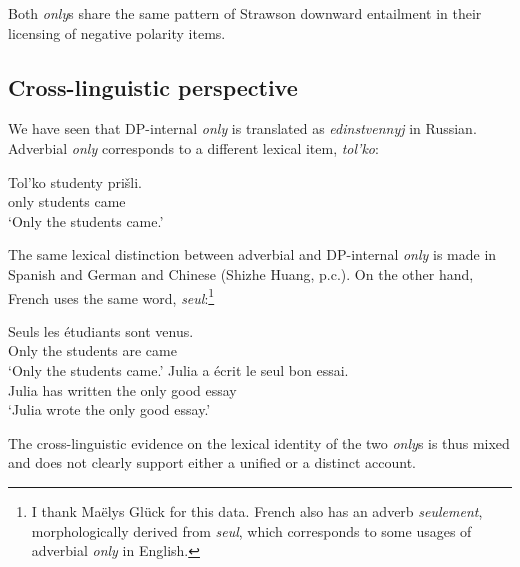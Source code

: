 Both \textit{only}s share the same pattern of Strawson downward entailment in their licensing of negative polarity items.

\subsection{Cross-linguistic perspective}
We have seen that DP-internal \textit{only} is translated as \textit{edinstvennyj} in Russian. Adverbial \textit{only} corresponds to a different lexical item, \textit{tol'ko}:

\begin{exe}
	\ex \gll Tol'ko studenty pri\v{s}li.\\
	only students came\\
	\glt `Only the students came.'
\end{exe}

The same lexical distinction between adverbial and DP-internal \textit{only} is made in Spanish and German \citep{mcnally08} and Chinese (Shizhe Huang, p.c.). On the other hand, French uses the same word, \textit{seul}:\footnote{I thank Ma\"{e}lys Gl\"{u}ck for this data. French also has an adverb \textit{seulement}, morphologically derived from \textit{seul}, which corresponds to some usages of adverbial \textit{only} in English.}

\begin{exe}
	\ex \gll Seuls les \'{e}tudiants sont venus.\\
	Only the students are came\\
	\glt `Only the students came.'
	\ex \gll Julia a \'{e}crit le seul bon essai.\\
	Julia has written the only good essay\\
	\glt `Julia wrote the only good essay.'
\end{exe}

The cross-linguistic evidence on the lexical identity of the two \textit{only}s is thus mixed and does not clearly support either a unified or a distinct account.

